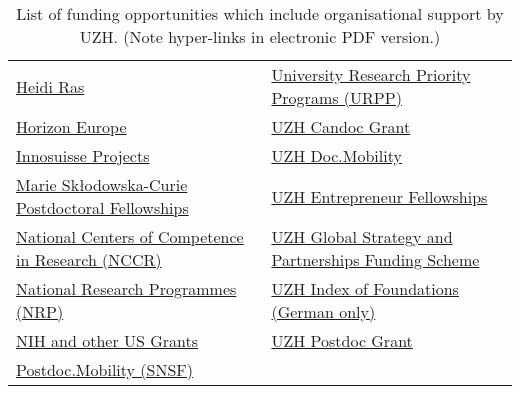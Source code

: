 \begin{table}[ht]
\begin{tabular}{ll}
\href{https://www.kispi.uzh.ch/forschungszentrum/nachwuchsfoerderung}{Heidi Ras} & \href{https://www.research.uzh.ch/en/funding/researchers/UFSP.html}{University Research Priority Programs (URPP)} \\
\href{https://grantsaccess.ethz.ch/de/horizon-europe.html}{Horizon Europe} & \href{https://www.research.uzh.ch/en/funding/phd/uzhcandoc.html}{UZH Candoc Grant} \\
\href{https://www.research.uzh.ch/en/funding/researchers/innosuisse.html}{Innosuisse Projects} & \href{https://www.research.uzh.ch/en/funding/phd/uzh-doc-mobility.html}{UZH Doc.Mobility} \\
\href{https://grantsaccess.ethz.ch/find/most-common-eu-programs/msca-pf.html}{Marie Skłodowska-Curie Postdoctoral Fellowships} & \href{https://www.research.uzh.ch/en/funding/postdoc/entrepreneur-fellowships.html}{UZH Entrepreneur Fellowships} \\
\href{https://www.research.uzh.ch/en/funding/researchers/NCCR.html}{National Centers of Competence in Research (NCCR)} & \href{https://www.global.uzh.ch/en/networks/funding-instruments/partnerships-fund.html}{UZH Global Strategy and Partnerships Funding Scheme} \\
\href{http://www.snf.ch/en/funding/programmes/national-research-programmes-nrp/Pages/default.aspx}{National Research Programmes (NRP)} & \href{https://www.research.uzh.ch/static/fnf/stiftungen/}{UZH Index of Foundations (German only)} \\
\href{https://grantsaccess.ethz.ch/submit/us-funding.html}{NIH and other US Grants} & \href{https://www.research.uzh.ch/en/funding/postdoc/uzhpostdoc.html}{UZH Postdoc Grant} \\
\href{https://www.research.uzh.ch/en/funding/postdoc/postdoc-mobility.html}{Postdoc.Mobility (SNSF)} & \href{ }{ }\\
\hline
\end{tabular}
\caption{List of funding opportunities which include organisational support by UZH. (Note hyper-links in electronic PDF version.)}
\label{tab:funding_opportunities}
\end{table}

\clearpage


